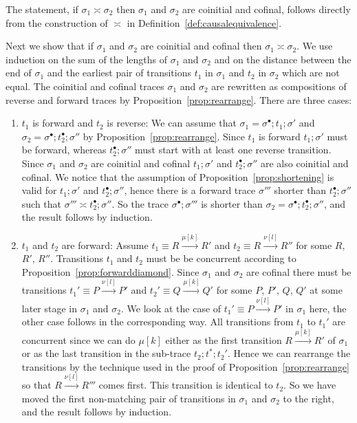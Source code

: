 \begin{pf}
The statement, if $\sigma_1 \asymp \sigma_2$ then $\sigma_1$ and $\sigma_2$ are coinitial and cofinal, 
follows directly from the construction of $\asymp$ in 
Definition~\ref{def:causalequivalence}.

Next we show that if $\sigma_1$ and $\sigma_2$ are coinitial and cofinal then $\sigma_1 \asymp \sigma_2$. 
We use induction on the sum of the lengths of $\sigma_1$ and $\sigma_2$ and on the distance between 
the end of $\sigma_1$ and the earliest pair of transitions $t_1$ in $\sigma_1$ and $t_2$ in $\sigma_2$
which are not equal. The coinitial and cofinal traces $\sigma_1$ and $\sigma_2$ are rewritten 
as compositions of reverse and forward traces by Proposition~\ref{prop:rearrange}. There are three cases:
\begin{enumerate}

\item $t_1$ is forward and $t_2$ is reverse: We can assume that $\sigma_1=\sigma^\bullet;t_1;\sigma'$ and $\sigma_2=\sigma^\bullet;t_2^\bullet;\sigma''$ by Proposition~\ref{prop:rearrange}. Since $t_1$ is forward $t_1;\sigma'$ must be forward, whereas $t_2^\bullet;\sigma''$ must start with at least one reverse transition. Since $\sigma_1$ and $\sigma_2$ are coinitial and cofinal $t_1;\sigma'$ and $t_2^\bullet;\sigma''$ are also coinitial and cofinal. We notice that the assumption of Proposition~\ref{prop:shortening} is valid for $t_1;\sigma'$ and $t_2^\bullet;\sigma''$, hence there is a forward trace  $\sigma'''$ shorter than $t_2^\bullet;\sigma''$ such that $\sigma''' \asymp t_2^\bullet;\sigma''$. So the trace $\sigma^\bullet;\sigma'''$ is shorter than $\sigma_2=\sigma^\bullet;t_2^\bullet;\sigma''$, and the result follows by induction.

\item $t_1$ and $t_2$ are forward: Assume $t_1 \equiv R \xrightarrow{\mu[k]} R'$ and $t_2  \equiv R \xrightarrow{\nu[l]} R''$ for some $R$, $R'$, $R''$. Transitions $t_1$ and $t_2$ must be be concurrent according to Proposition~\ref{prop:forwarddiamond}. Since $\sigma_1$ and $\sigma_2$ are cofinal there must be transitions $t_1' \equiv P \xrightarrow{\nu[l]} P'$ and $t_2'  \equiv Q \xrightarrow{\mu[k]} Q'$ for some $P$, $P'$, $Q$, $Q'$ at some later stage in $\sigma_1$ and $\sigma_2$. We look at the case of $t_1' \equiv P \xrightarrow{\nu[l]} P'$ in $\sigma_1$ here, the other case follows in the corresponding way. 
All transitions from $t_1$ to $t_1'$ are concurrent since we can do $\mu[k]$ either as the first transition $R \xrightarrow{\mu[k]} R'$ of $\sigma_1$ or as the last transition in the sub-trace $t_2;t^*;t_2'$. Hence
we can rearrange the transitions by the technique used in the proof of Proposition~\ref{prop:rearrange} so that $R \xrightarrow{\nu[l]} R'''$ comes first. This transition is identical to $t_2$. So we have moved the first non-matching pair of transitions in $\sigma_1$ and $\sigma_2$ to the right, and the result follows by induction.


\end{enumerate}
\end{pf}
